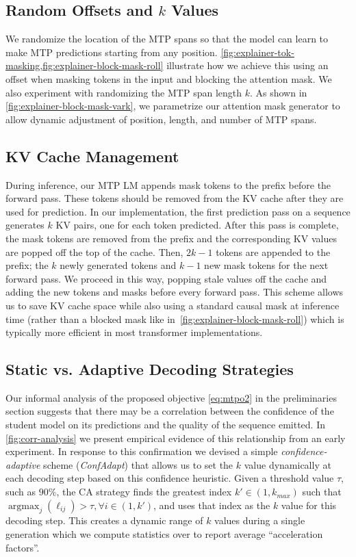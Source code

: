 \documentclass{article}
\theoremstyle{plain}
\theoremstyle{definition}
\theoremstyle{remark}
\begin{document}
\subsection{Random Offsets and $k$ Values}\label{sec:impl-randomize}

We randomize the location of the MTP spans so that the model can learn to make MTP predictions starting from any position.
\cref{fig:explainer-tok-masking,fig:explainer-block-mask-roll} illustrate how we achieve this using an offset when masking tokens in the input and blocking the attention mask. We also experiment with randomizing the MTP span length $k$. As shown in \cref{fig:explainer-block-mask-vark}, we parametrize our attention mask generator to allow dynamic adjustment of position, length, and number of MTP spans.

\subsection{KV Cache Management}\label{sec:impl-kvcache}
 
During inference, our MTP LM appends mask tokens to the prefix before the forward pass. These tokens should be removed from the KV cache after they are used for prediction.  In our implementation, the first prediction pass on a sequence generates $k$ KV pairs, one for each token predicted.  After this pass is complete, the mask tokens are removed from the prefix and the corresponding KV values are popped off the top of the cache. Then, $2k-1$ tokens are appended to the prefix; the $k$ newly generated tokens and $k-1$ new mask tokens for the next forward pass.  We proceed in this way, popping stale values off the cache and adding the new tokens and masks before every forward pass. This scheme allows us to save KV cache space while also using a standard causal mask at inference time (rather than a blocked mask like in~\cref{fig:explainer-block-mask-roll}) which is typically more efficient in most transformer implementations.

\subsection{Static vs. Adaptive Decoding Strategies}\label{sec:impl-confadapt}
Our informal analysis of the proposed objective \cref{eq:mtpo2} in the preliminaries section suggests that there may be a correlation between the confidence of the student model on its predictions and the quality of the sequence emitted.
In \cref{fig:corr-analysis} we present empirical evidence of this relationship from an early experiment. In response to this confirmation we devised a simple \textit{confidence-adaptive} scheme (\textit{ConfAdapt}) that allows us to set the $k$ value dynamically at each decoding step based on this confidence heuristic. Given a threshold value $\tau$, such as $90\%$, the CA strategy finds the greatest index $k' \in (1,k_{max})$ such that $\operatorname{argmax}_j(\ell_{ij}) > \tau, \forall i \in (1,k')$, and uses that index as the $k$ value for this decoding step. This creates a dynamic range of $k$ values during a single generation which we compute statistics over to report average ``acceleration factors''.
\end{document}
